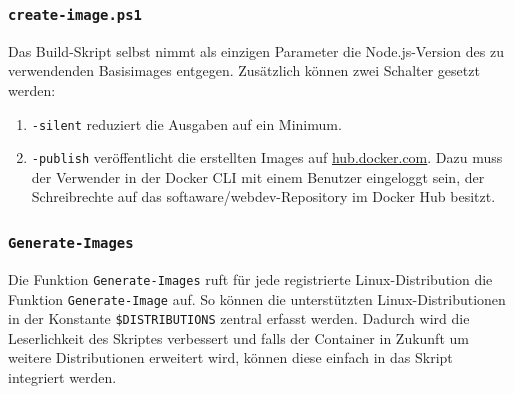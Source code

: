 \subsubsection{\texttt{create-image.ps1}}
Das Build-Skript selbst nimmt als einzigen Parameter die Node.js-Version des zu verwendenden Basisimages entgegen.
Zusätzlich können zwei Schalter gesetzt werden:
\begin{enumerate}
    \item \verb|-silent| reduziert die Ausgaben auf ein Minimum.
    \item \verb|-publish| veröffentlicht die erstellten Images auf \url{hub.docker.com}.
        Dazu muss der Verwender in der Docker CLI mit einem Benutzer eingeloggt sein, der Schreibrechte auf das softaware/webdev-Repository im Docker Hub besitzt.
\end{enumerate}

\subsubsection{\texttt{Generate-Images}}
Die Funktion \verb|Generate-Images| ruft für jede registrierte Linux-Distribution die Funktion \verb|Generate-Image| auf.
So können die unterstützten Linux-Distributionen in der Konstante \verb|$DISTRIBUTIONS| zentral erfasst werden.
Dadurch wird die Leserlichkeit des Skriptes verbessert und falls der Container in Zukunft um weitere Distributionen erweitert wird, können diese einfach in das Skript integriert werden.

